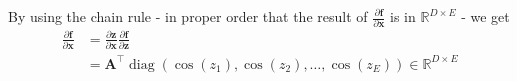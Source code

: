 \documentclass[11pt]{article}
\begin{document}
\begin{enumerate}
By using the chain rule - in proper order that the result of
$\frac{\partial\bm f}{\partial\bm x}$ is in $\mathbb{R}^{D\times E}$ - we get
\begin{align*}
\frac{\partial\bm f}{\partial\bm x}
& =\frac{\partial\bm z}{\partial\bm x}\frac{\partial\bm f}{\partial\bm z} \\
& =\bm A^{\top}
\operatorname{diag}(\cos{(z_{1})},\cos{(z_{2})},\dots,\cos{(z_{E})})
\in\mathbb{R}^{D\times E}
\end{align*}
\end{enumerate}
\end{document}
